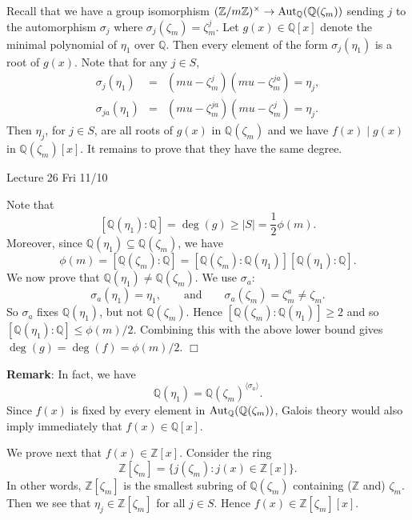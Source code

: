 \documentclass{article}
\def\Z{{\mathbb Z}}
\def\Aut{{\rm Aut}}
\def\Q{{\mathbb Q}}
\def\Z{{\mathbb Z}}
\def\Q{{\mathbb Q}}
\newenvironment{proof}{\noindent {\bf Proof:}}{$\Box$ \vspace{2 ex}}
\newcommand{\add}[1]{{\color{blue} #1}}
\begin{document}
\begin{proof}
Recall that we have a group isomorphism $(\Z/m\Z)^\times\rightarrow\Aut_\Q(\Q(\zeta_m))$ sending $j$ to the automorphism $\sigma_j$ where $\sigma_j(\zeta_m) = \zeta_m^j$. Let $g(x)\in\Q[x]$ denote the minimal polynomial of $\eta_1$ over $\Q$. Then every element of the form $\sigma_j(\eta_1)$ is a root of $g(x)$. Note that for any $j\in S$,
\begin{eqnarray*}
    \sigma_j(\eta_1) &=& (mu - \zeta_m^j)(mu - \zeta_m^{ja}) = \eta_j,\\
    \sigma_{ja}(\eta_1) &=& (mu - \zeta_m^{ja})(mu - \zeta_m^j)= \eta_j.
\end{eqnarray*}
 Then $\eta_j$, for $j\in S$, are all roots of $g(x)$ in $\Q(\zeta_m)$ and we have $f(x)\mid g(x)$ in $\Q(\zeta_m)[x]$. It remains to prove that they have the same degree. 
 
 
\begin{center}
    \add{Lecture 26 Fri 11/10}
\end{center}

Note that
$$[\Q(\eta_1):\Q] = \deg(g) \geq |S| = \frac12\phi(m).$$
Moreover, since $\Q(\eta_1)\subseteq \Q(\zeta_m)$, we have
$$\phi(m) = [\Q(\zeta_m):\Q] = [\Q(\zeta_m):\Q(\eta_1)][\Q(\eta_1):\Q].$$
We now prove that $\Q(\eta_1)\neq\Q(\zeta_m)$. We use $\sigma_a:$
$$\sigma_a(\eta_1) = \eta_1,\qquad\mbox{and}\qquad \sigma_a(\zeta_m) = \zeta_m^a\neq\zeta_m.$$
So $\sigma_a$ fixes $\Q(\eta_1)$, but not $\Q(\zeta_m)$. Hence $[\Q(\zeta_m):\Q(\eta_1)] \geq 2$ and so $[\Q(\eta_1):\Q]\leq \phi(m)/2$. Combining this with the above lower bound gives $\deg(g) = \deg(f) = \phi(m)/2$.
\end{proof}

\noindent\textbf{Remark}: In fact, we have 
$$\Q(\eta_1) = \Q(\zeta_m)^{\langle\sigma_a\rangle}.$$ Since $f(x)$ is fixed by every element in $\Aut_\Q(\Q(\zeta_m))$, Galois theory would also imply immediately that $f(x)\in\Q[x]$.

\vspace{5pt}
We prove next that $f(x)\in\Z[x]$. Consider the ring $$\Z[\zeta_m] = \{j(\zeta_m)\colon j(x)\in\Z[x]\}.$$
In other words, $\Z[\zeta_m]$ is the smallest subring of $\Q(\zeta_m)$ containing ($\Z$ and) $\zeta_m$. Then we see that $\eta_j\in \Z[\zeta_m]$ for all $j\in S$. Hence $f(x)\in \Z[\zeta_m][x]$.
\end{document}
